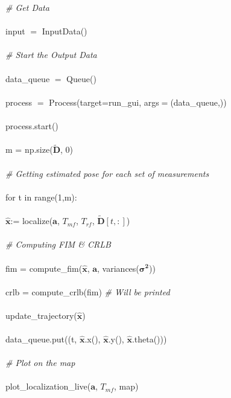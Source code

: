 \documentclass[12pt, titlepage]{article}
\begin{document}
\noindent \textit{\# Get Data}\\\\
\noindent input $=$ InputData()\\\\
\noindent \textit{\# Start the Output Data}\\\\
\noindent data\_queue $=$ Queue()\\\\
\noindent process $=$ Process(target=run\_gui, args$=$(data\_queue,))\\\\
\noindent process.start()\\\\
\noindent m = np.size($\mathbf{\tilde{D}}$, 0)\\\\
\noindent \textit{\# Getting estimated pose for each set of measurements}\\\\
\noindent for t in range(1,m): \\\\
\indent $\mathbf{\hat{x}}$:= localize($\mathbf{a}$, $T_{mf}$, $T_{rf}$, $\mathbf{\tilde{D}}[t,:]$)\\\\
\indent \textit{\# Computing FIM \& CRLB} \\\\
\indent  fim = compute\_fim($\mathbf{\hat{x}}$, $\mathbf{a}$, variances($\boldsymbol{\sigma^2}$))\\\\
\indent  crlb = compute\_crlb(fim) \textit{\# Will be printed}\\\\
\indent update\_trajectory($\mathbf{\hat{x}}$)\\\\
\indent data\_queue.put((t, $\mathbf{\hat{x}}$.x(), $\mathbf{\hat{x}}$.y(), $\mathbf{\hat{x}}$.theta()))\\\\
\noindent \textit{\# Plot on the map}\\\\
\noindent plot\_localization\_live($\mathbf{a}$, $T_{mf}$, map)

\end{document}
